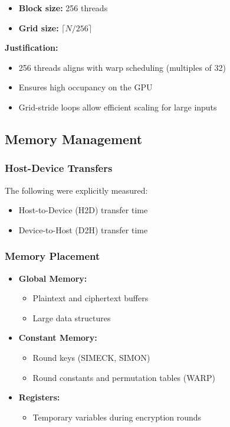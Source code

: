 \begin{itemize}
    \item \textbf{Block size:} 256 threads
    \item \textbf{Grid size:} $\lceil N / 256 \rceil$
\end{itemize}

\textbf{Justification:}
\begin{itemize}
    \item 256 threads aligns with warp scheduling (multiples of 32)
    \item Ensures high occupancy on the GPU
    \item Grid-stride loops allow efficient scaling for large inputs
\end{itemize}

\subsection{Memory Management}

\subsubsection{Host-Device Transfers}

The following were explicitly measured:
\begin{itemize}
    \item Host-to-Device (H2D) transfer time
    \item Device-to-Host (D2H) transfer time
\end{itemize}

\subsubsection{Memory Placement}

\begin{itemize}
    \item \textbf{Global Memory:}
    \begin{itemize}
        \item Plaintext and ciphertext buffers
        \item Large data structures
    \end{itemize}

    \item \textbf{Constant Memory:}
    \begin{itemize}
        \item Round keys (SIMECK, SIMON)
        \item Round constants and permutation tables (WARP)
    \end{itemize}

    \item \textbf{Registers:}
    \begin{itemize}
        \item Temporary variables during encryption rounds
    \end{itemize}
\end{itemize}

